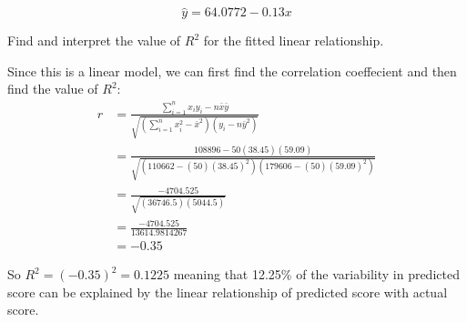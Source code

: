 \documentclass{examsetup}\usepackage[]{graphicx}\usepackage[]{color}
\begin{document}
\begin{questions}
\begin{parts}
\begin{subparts}
\begin{solution}
         $$
         \hat{y} = 64.0772 - 0.13 x 
         $$

      \end{solution} 
      \subpart[5] Find and interpret the value of $R^2$ for the fitted linear relationship.
      \begin{solution}
         Since this is a linear model, we can first find the correlation coeffecient and then find the value of $R^2$:
         \begin{align*}
         r 
         &= 
         \frac{
            \sum_{i=1}^n x_i y_i - n \bar{x} \bar{y}
         }{
            \sqrt{\left(\sum_{i=1}^n x_i^2 - \bar{x}^2 \right) \left(y_i - n \bar{y}^2 \right)}
         }\\
         &= 
         \frac{
            108896 - 50 (38.45)(59.09)
         }{
            \sqrt{\left(110662 - (50)( 38.45)^2 \right)
            \left(179606 - (50)( 59.09)^2 \right)}
         }\\
         &= 
         \frac{
            \ensuremath{-4704.525}
         }{
            \sqrt{\left(36746.5 \right)
            \left(5044.5 \right)}
         }\\
         &= 
         \frac{
            \ensuremath{-4704.525}
         }{
            13614.9814267
         }
         \\
         &= \ensuremath{-0.35}
         \end{align*}

         So $R^2 = 
          (\ensuremath{-0.35})^2
            = 
          0.1225
     $ 
     meaning that 12.25\% of the variability in predicted score can be explained by the linear relationship of predicted score with actual score.
      \end{solution}


\end{subparts}
\end{parts}
\end{questions}
\end{document}
